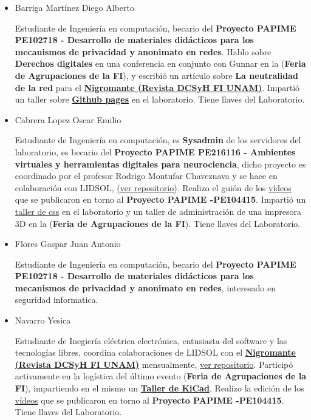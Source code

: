 \documentclass[a4paper,11pt]{article}                 %
\begin{document}
\begin{itemize}
    \item Barriga Martínez Diego Alberto
    
    Estudiante de Ingeniería en computación, becario del \textbf{Proyecto PAPIME PE102718 - Desarrollo de materiales didácticos para los mecanismos de privacidad y anonimato en redes}. Hablo sobre \textbf{Derechos digitales} en una conferencia en conjunto con Gunnar en la (\textbf{Feria de Agrupaciones de la FI}), y escribió un artículo sobre \textbf{La neutralidad de la red} para el \href{https://issuu.com/nigromantefi}{\textbf{Nigromante  (Revista DCSyH FI  UNAM)}}. Impartió un taller sobre \href{https://github.com/umoqnier/personal-page}{\textbf{Github pages}} en el laboratorio. Tiene llaves del Laboratorio.
    
    \item Cabrera Lopez Oscar Emilio 
    
    Estudiante de Ingeniería en computación, es \textbf{Sysadmin} de los servidores del laboratorio, es becario del \textbf{Proyecto PAPIME PE216116 - Ambientes virtuales y herramientas digitales para neurociencia}, dicho proyecto es coordinado por el profesor Rodrigo Montufar Chaveznava y se hace en colaboración con LIDSOL, \href{https://github.com/LIDSOL/portia}{(ver repositorio)}. Realizo el guión de los \href{https://www.youtube.com/channel/UCwHFqMqxUcCAJSdek3e4zOw}{vídeos} que se publicaron en torno al  \textbf{Proyecto PAPIME -PE104415}. Impartió un \href{https://lidsol.org/talleres/0002_css_basico.html}{taller de css} en el laboratorio y un taller de administración de una impresora 3D en la (\textbf{Feria de Agrupaciones de la FI}). Tiene llaves del Laboratorio.
    
    \item Flores Gaspar Juan Antonio
    
    Estudiante de Ingeniería en computación, becario del \textbf{Proyecto PAPIME PE102718 - Desarrollo de materiales didácticos para los mecanismos de privacidad y anonimato en redes}, interesado en seguridad informatica. 
    

    \item Navarro Yesica 
    
    Estudiante de Inegiería eléctrica electrónica, entusiasta del software y las tecnologías libres, coordina colaboraciones de LIDSOL con el \href{https://issuu.com/nigromantefi}{\textbf{Nigromante  (Revista DCSyH FI  UNAM)}} mensualmente, \href{https://github.com/LIDSOL/material-didactico/tree/master/nigromante}{ver repositorio}. Participó activamente en la logística del último evento (\textbf{Feria de Agrupaciones de la FI}),  impartiendo en el mismo un \href{https://github.com/yesn7/taller-kicad/}{\textbf{Taller de KiCad}}. Realizo la edición de los \href{https://www.youtube.com/channel/UCwHFqMqxUcCAJSdek3e4zOw}{vídeos} que se publicaron en torno al  \textbf{Proyecto PAPIME -PE104415}. Tiene llaves del Laboratorio.
    

\end{itemize}
\end{document}
